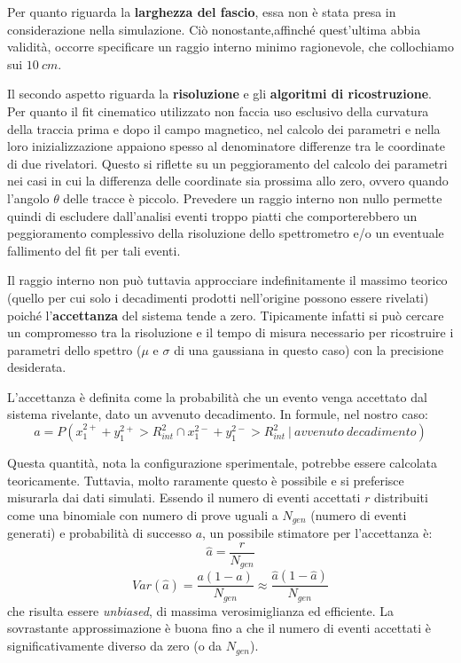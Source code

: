 \documentclass[8pt]{extarticle}
\begin{document}
Per quanto riguarda la \textbf{larghezza del fascio}, essa non è stata presa in considerazione nella simulazione. Ciò nonostante,affinché quest'ultima abbia validità, occorre specificare un raggio interno minimo ragionevole, che collochiamo sui $10\ cm$. \medskip	

Il secondo aspetto riguarda la \textbf{risoluzione} e gli \textbf{algoritmi di ricostruzione}. Per quanto il fit cinematico utilizzato non faccia uso esclusivo della curvatura della traccia prima e dopo il campo magnetico, nel calcolo dei parametri e nella loro inizializzazione appaiono spesso  al denominatore differenze tra le coordinate di due rivelatori. Questo si riflette su un peggioramento del calcolo dei parametri nei casi in cui la differenza delle coordinate sia prossima allo zero, ovvero quando l'angolo $\theta$ delle tracce è piccolo. Prevedere un raggio interno non nullo permette quindi di escludere dall'analisi eventi troppo piatti che comporterebbero un peggioramento complessivo della risoluzione dello spettrometro e/o un eventuale fallimento del fit per tali eventi. \medskip

Il raggio interno non può tuttavia approcciare indefinitamente il massimo teorico (quello per cui solo i decadimenti prodotti nell'origine possono essere rivelati) poiché l'\textbf{accettanza} del sistema tende a zero. Tipicamente infatti si può cercare un compromesso tra la risoluzione e il tempo di misura necessario per ricostruire i parametri dello spettro ($\mu$ e $\sigma$ di una gaussiana in questo caso) con la precisione desiderata. \medskip

L'accettanza è definita come la probabilità che un evento venga accettato dal sistema rivelante, dato un avvenuto decadimento. In formule, nel nostro caso: \\
$$
a = P(x_1^{2+} + y_1^{2+} > R_{int}^2 \cap x_1^{2-} + y_1^{2-} > R_{int}^2\ |\ avvenuto\ decadimento)
$$

Questa quantità, nota la configurazione sperimentale, potrebbe essere calcolata teoricamente. Tuttavia, molto raramente questo è possibile e si preferisce misurarla dai dati simulati. Essendo il numero di eventi accettati $r$ distribuiti come una binomiale con numero di prove uguali a $N_{gen}$ (numero di eventi generati) e probabilità di successo $a$, un possibile stimatore per l'accettanza è: 
$$
\hat{a} = \frac{r}{N_{gen}}
$$
$$
Var(\hat{a}) = \frac{a(1-a)}{N_{gen}} \approx \frac{\hat{a}(1-\hat{a})}{N_{gen}}
$$
che risulta essere \textit{unbiased}, di massima verosimiglianza ed efficiente. La sovrastante approssimazione è buona fino a che il numero di eventi accettati è significativamente diverso da zero (o da $N_{gen}$). 
\end{document}
